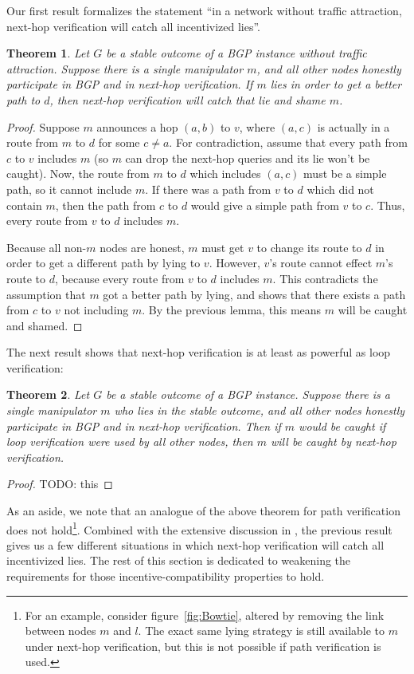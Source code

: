 \documentclass[10pt]{article}
\newtheorem{theorem}{Theorem}
\begin{document}
  Our first result formalizes the statement ``in a network without
  traffic attraction,
  next-hop verification will catch all incentivized lies''.
  \begin{theorem}
    Let $G$ be a stable outcome of a BGP instance without traffic attraction.
    Suppose there is a single manipulator $m$,
    and all other nodes honestly participate in BGP and in next-hop verification.
    If $m$ lies in order to get a better path to $d$,
    then next-hop verification will catch that lie and shame $m$.
  \end{theorem}
  \begin{proof}
    Suppose $m$ announces a hop $(a,b)$ to $v$, where $(a,c)$ is actually in
    a route from $m$ to $d$ for some $c\ne a$.
    For contradiction, assume that every path from $c$ to $v$ includes $m$
    (so $m$ can drop the next-hop queries and its lie won't be caught).
    Now, the route from $m$ to $d$ which includes $(a,c)$ must be a simple
    path, so it cannot include $m$.
    If there was a path from $v$ to $d$ which did not contain $m$, then the
    path from $c$ to $d$ would give a simple path from $v$ to $c$.
    Thus, every route from $v$ to $d$ includes $m$.

    Because all non-$m$ nodes are honest, $m$ must get $v$ to change its route
    to $d$ in order to get a different path by lying to $v$.
    However, $v$'s route cannot effect $m$'s route to $d$, because
    every route from $v$ to $d$ includes $m$.
    This contradicts the assumption that $m$ got a better path by lying,
    and shows that there exists a path from $c$ to $v$ not including $m$.
    By the previous lemma, this means $m$ will be caught and shamed.
  \end{proof}

  The next result shows that next-hop verification is at least as
  powerful as loop verification:
  \begin{theorem}
    Let $G$ be a stable outcome of a BGP instance.
    Suppose there is a single manipulator $m$ who lies in the stable outcome,
    and all other nodes honestly participate in BGP and in next-hop verification.
    Then if $m$ would be caught if loop verification were used by all other
    nodes, then $m$ will be caught by next-hop verification.
  \end{theorem}
  \begin{proof}
    TODO: this
  \end{proof}
  As an aside, we note that an analogue of the above theorem for path
  verification does not hold\footnote{
    For an example, consider figure~\ref{fig:Bowtie}, altered by removing the
    link between nodes $m$ and $l$. The exact same lying strategy is still
    available to $m$ under next-hop verification, but this is not possible if
    path verification is used.
  }.
  Combined with the extensive discussion in \cite{Attraction},
  the previous result gives us a few different situations in which
  next-hop verification will catch all incentivized lies.
  The rest of this section is dedicated to weakening the requirements
  for those incentive-compatibility properties to hold.
\end{document}
